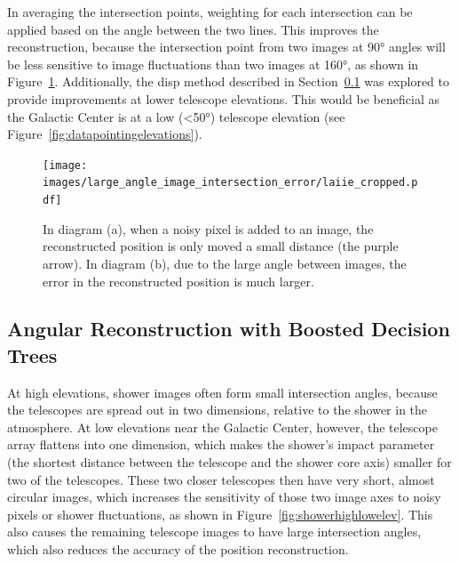   In averaging the intersection points, weighting for each intersection can be applied based on the angle between the two lines.
  This improves the reconstruction, because the intersection point from two images at \ang{90} angles will be less sensitive to image fluctuations than two images at \ang{160}, as shown in Figure~\ref{fig:largeintersectangle}.
  Additionally, the disp method described in Section~\ref{subsec:disp} was explored to provide improvements at lower telescope elevations.
  This would be beneficial as the Galactic Center is at a low (<\ang{50}) telescope elevation (see Figure~\ref{fig:datapointingelevations}).

  \begin{figure}[!t]
    \centering
    \texttt{[image: images/large\_angle\_image\_intersection\_error/laiie\_cropped.pdf]}
    \caption[Large Image Intersection Angles]{
      In diagram (a), when a noisy pixel is added to an image, the reconstructed position is only moved a small distance (the purple arrow).
      In diagram (b), due to the large angle between images, the error in the reconstructed position is much larger.
    }
    \label{fig:largeintersectangle}
  \end{figure}
  \FloatBarrier

  \subsection{Angular Reconstruction with Boosted Decision Trees}\label{subsec:disp}
    At high elevations, shower images often form small intersection angles, because the telescopes are spread out in two dimensions, relative to the shower in the atmosphere.
    At low elevations near the Galactic Center, however, the telescope array flattens into one dimension, which makes the shower's impact parameter (the shortest distance between the telescope and the shower core axis) smaller for two of the telescopes.
    These two closer telescopes then have very short, almost circular images, which increases the sensitivity of those two image axes to noisy pixels or shower fluctuations, as shown in Figure~\ref{fig:showerhighlowelev}.
    This also causes the remaining telescope images to have large intersection angles, which also reduces the accuracy of the position reconstruction.

